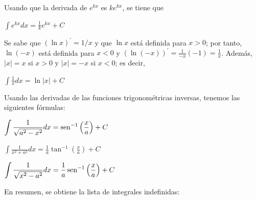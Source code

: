 \begin{parrafonumerado}
\item Usando que la derivada de $e^{kx}$ es $k e^{kx}$, se tiene que
  \begin{center}
    $\displaystyle{\int e^{kx}dx=\frac{1}{k}e^{kx}+C}$
  \end{center}

\item Se sabe que {\small $(\ln x)^\prime=1/x$} y que {\small $\ln x$} está definida para {\small $x>0$}; por tanto, {\small $\ln(-x)$} está definida para {\small $x< 0$} y {\small $(\ln(-x))^\prime=\frac{1}{-x}(-1)=\frac{1}{x}$}. Además, {\small $\vert x\vert=x$} si {\small $x>0$} y {\small $\vert x\vert=-x$} si {\small $x<0$}; es decir,
  \begin{center}
    $\displaystyle{\int \frac{1}{x}dx=\ln \left\vert x\right\vert +C}$
  \end{center}

\item Usando las derivadas de las funciones trigonométricas inversas, tenemos las siguientes fórmulas:
  {\small
    \begin{center}
      $\displaystyle{\int \frac{1}{\sqrt{a^{2}-x^{2}}}dx=\operatorname{sen}^{-1} \left(\frac{x}{a}\right)+C}$
    \end{center}

    \begin{center}
      $\displaystyle{\int \frac{1}{x^{2}+a^{2}}dx=\frac{1}{a}\tan^{-1} \left(\frac{x}{a}\right)+C}$
    \end{center}

    \begin{center}
      $\displaystyle{\int \frac{1}{\sqrt{x^{2}-a^{2}}}dx=\frac{1}{a}\operatorname{sen}^{-1} \left(\frac{x}{a}\right)+C}$
    \end{center}
  }
\end{parrafonumerado}

En resumen, se obtiene la lista de integrales indefinidas\label{TablaResumen}:

\vspace{\baselineskip}

